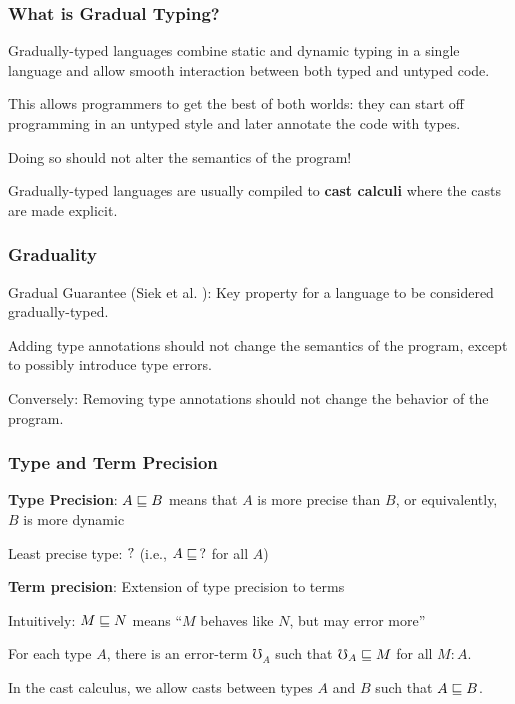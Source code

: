 \documentclass[
	11pt, %
]{beamer}
\begin{document}
\begin{frame}
	\frametitle{What is Gradual Typing?}

	Gradually-typed languages combine static and dynamic typing in a single language
	and allow smooth interaction between both typed and untyped code.

	\bigskip

	This allows programmers to get the best of both worlds: they can start off programming
	in an untyped style and later annotate the code with types.

	\bigskip

	Doing so should not alter the semantics of the program!

	\bigskip

	Gradually-typed languages are usually compiled to \textbf{cast calculi} where the casts
	are made explicit.


\end{frame}

\begin{frame}
	\frametitle{Graduality}

	Gradual Guarantee (Siek et al. \cite{SVCB2015}):
	Key property for a language to be considered gradually-typed.

	\smallskip

	Adding type annotations should not change the semantics of the program, except to possibly introduce type errors.

	\medskip

	Conversely: Removing type annotations should not change the behavior of the program.

\end{frame}


\begin{frame}
	\frametitle{Type and Term Precision}

	\textbf{Type Precision}: $A \sqsubseteq B$ means that $A$ is more precise than $B$,
	or equivalently, $B$ is more dynamic

	Least precise type: $?$ (i.e., $A \sqsubseteq\, ?$ for all $A$)

	\medskip

	\textbf{Term precision}: Extension of type precision to terms

	Intuitively: $M \sqsubseteq N$ means ``$M$ behaves like $N$, but may error more''

	For each type $A$, there is an error-term $\mho_A$ such that $\mho_A \sqsubseteq M$ for all $M : A$.

	\medskip

	In the cast calculus, we allow casts between types $A$ and $B$ such that $A \sqsubseteq B$.


	
\end{frame}
\end{document}
